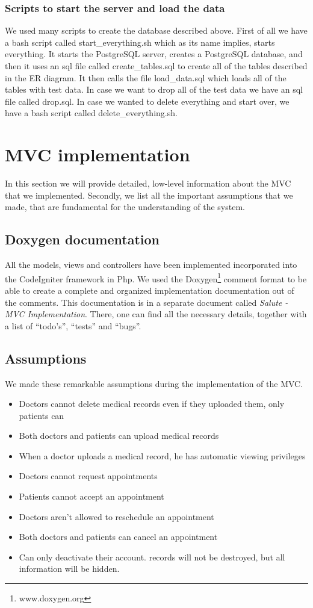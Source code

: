 \subsubsection{Scripts to start the server and load the data}
We used many scripts to create the database described above.  First of all we have a bash script called start\_everything.sh which as its name implies, starts everything.  It starts the PostgreSQL server, creates a PostgreSQL database, and then it uses an sql file called create\_tables.sql to create all of the tables described in the ER diagram.  It then calls the file load\_data.sql which loads all of the tables with test data.  In case we want to drop all of the test data we have an sql file called drop.sql.  In case we wanted to delete everything and start over, we have a bash script called delete\_everything.sh. 

\section{MVC implementation}
\label{sec:mvcimplement}
In this section we will provide detailed, low-level information about the MVC that we implemented. Secondly, we list all the important assumptions that we made, that are fundamental for the understanding of the system.

\subsection{Doxygen documentation}
All the models, views and controllers have been implemented incorporated into the CodeIgniter framework in Php. We used the Doxygen\footnote{www.doxygen.org} comment format to be able to create a complete and organized implementation documentation out of the comments. This documentation is in a separate document called \emph{Salute - MVC Implementation}. There, one can find all the necessary details, together with a list of ``todo's'', ``tests'' and  ``bugs''.

\subsection{Assumptions}
We made these remarkable assumptions during the implementation of the MVC.
\begin{itemize}
\item Doctors cannot delete medical records even if they uploaded them, only patients can
\item Both doctors and patients can upload medical records
\item When a doctor uploads a medical record, he has automatic viewing privileges
\item Doctors cannot request appointments
\item Patients cannot accept an appointment
\item Doctors aren't allowed to reschedule an appointment
\item Both doctors and patients can cancel an appointment
\item Can only deactivate their account. records will not be destroyed, but all information will be hidden. 
\end{itemize}

